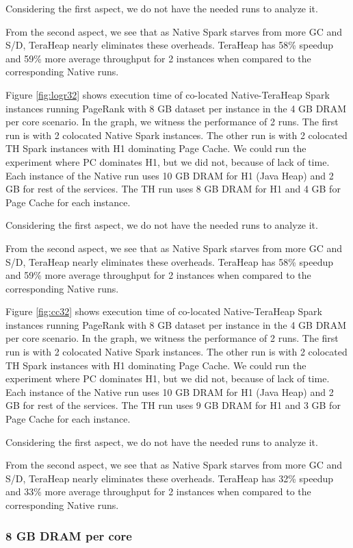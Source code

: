 Considering the first aspect, we do not have the needed runs to analyze it.

From the second aspect, we see that as Native Spark starves from more GC and S/D, TeraHeap nearly eliminates these overheads. TeraHeap has 58\% speedup and 59\% more average throughput for 2 instances when compared to the corresponding Native runs.

Figure \ref{fig:logr32} shows execution time of co-located
Native-TeraHeap Spark instances running PageRank with 8 GB
dataset per instance in the 4 GB DRAM per core scenario.
In the graph, we witness the performance of 2 runs. The first run is with 2 colocated Native Spark instances.
The other run is with 2 colocated TH Spark instances with H1 dominating Page Cache.
We could run the experiment where PC dominates H1, but we did not, because of lack of time.
Each instance of the Native run uses 10 GB DRAM for H1 (Java Heap) and 2 GB for rest of the services.
The TH run uses 8 GB DRAM for H1 and 4 GB for Page Cache for each instance.

Considering the first aspect, we do not have the needed runs to analyze it.

From the second aspect, we see that as Native Spark starves from more GC and S/D, TeraHeap nearly eliminates these overheads. TeraHeap has 58\% speedup and 59\% more average throughput for 2 instances when compared to the corresponding Native runs.

Figure \ref{fig:cc32} shows execution time of co-located
Native-TeraHeap Spark instances running PageRank with 8 GB
dataset per instance in the 4 GB DRAM per core scenario.
In the graph, we witness the performance of 2 runs. The first run is with 2 colocated Native Spark instances.
The other run is with 2 colocated TH Spark instances with H1 dominating Page Cache.
We could run the experiment where PC dominates H1, but we did not, because of lack of time.
Each instance of the Native run uses 10 GB DRAM for H1 (Java Heap) and 2 GB for rest of the services.
The TH run uses 9 GB DRAM for H1 and 3 GB for Page Cache for each instance.

Considering the first aspect, we do not have the needed runs to analyze it.

From the second aspect, we see that as Native Spark starves from more GC and S/D, TeraHeap nearly eliminates these overheads. TeraHeap has 32\% speedup and 33\% more average throughput for 2 instances when compared to the corresponding Native runs.

\subsubsection{8 GB DRAM per core}

